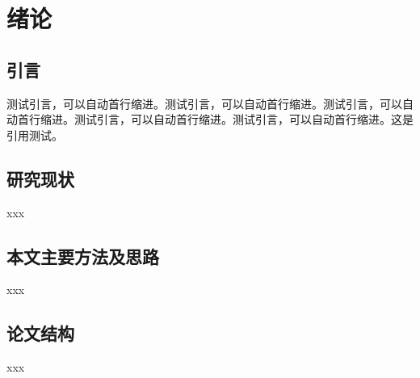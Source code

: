 
\chapter{绪论}

\section{引言}
测试引言，可以自动首行缩进。测试引言，可以自动首行缩进。测试引言，可以自动首行缩进。测试引言，可以自动首行缩进。测试引言，可以自动首行缩进。这是引用测试\cite{barnes2009patchmatch}。

\section{研究现状}
xxx

\section{本文主要方法及思路}

xxx

\section{论文结构}
xxx





